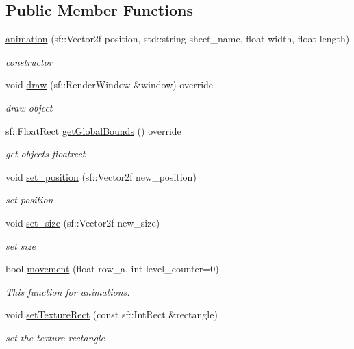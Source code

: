 \subsection*{Public Member Functions}
\begin{DoxyCompactItemize}
\item 
\hyperlink{classanimation_ab6798454a7dba29097eb398014c584bc}{animation} (sf\+::\+Vector2f position, std\+::string sheet\+\_\+name, float width, float length)
\begin{DoxyCompactList}\small\item\em constructor \end{DoxyCompactList}\item 
void \hyperlink{classanimation_a20959b66d1c25007890bb40f0e876570}{draw} (sf\+::\+Render\+Window \&window) override
\begin{DoxyCompactList}\small\item\em draw object \end{DoxyCompactList}\item 
sf\+::\+Float\+Rect \hyperlink{classanimation_aae3322323bf3dea83723969f364e18e0}{get\+Global\+Bounds} () override
\begin{DoxyCompactList}\small\item\em get objects floatrect \end{DoxyCompactList}\item 
void \hyperlink{classanimation_ac461adb38b8241427150c4620ee31358}{set\+\_\+position} (sf\+::\+Vector2f new\+\_\+position)
\begin{DoxyCompactList}\small\item\em set position \end{DoxyCompactList}\item 
void \hyperlink{classanimation_a7c0b874294e81f3612590920fd845602}{set\+\_\+size} (sf\+::\+Vector2f new\+\_\+size)
\begin{DoxyCompactList}\small\item\em set size \end{DoxyCompactList}\item 
bool \hyperlink{classanimation_af213ade7eb27bba8337ec6223c73f945}{movement} (float row\+\_\+a, int level\+\_\+counter=0)
\begin{DoxyCompactList}\small\item\em This function for animations. \end{DoxyCompactList}\item 
void \hyperlink{classanimation_a30e84ff71206b8ec4f82fd70ad776036}{set\+Texture\+Rect} (const sf\+::\+Int\+Rect \&rectangle)
\begin{DoxyCompactList}\small\item\em set the texture rectangle \end{DoxyCompactList}\end{DoxyCompactItemize}
